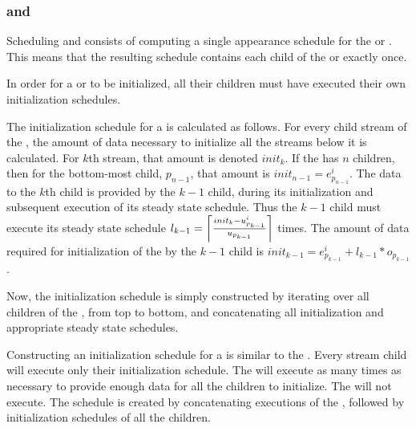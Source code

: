 \subsubsection{{\pipelines} and {\splitjoins}}

Scheduling {\pipelines} and {\splitjoin} consists of computing a
single appearance schedule for the {\pipeline} or {\splitjoin}.
This means that the resulting schedule contains each child of the
{\pipeline} or {\splitjoin} exactly once.

 In order for a
{\pipeline} or {\splitjoin} to be initialized, all their children
must have executed their own initialization schedules.

The initialization schedule for a {\pipeline} is calculated as
follows. For every child stream of the {\pipeline}, the amount of
data necessary to initialize all the streams below it is
calculated. For $k$th stream, that amount is denoted $init_k$. If
the {\pipeline} has $n$ children, then for the bottom-most child,
$p_{n-1}$, that amount is $init_{n-1} = e^i_{p_{n-1}}$. The data
to the $k$th child is provided by the $k-1$ child, during its
initialization and subsequent execution of its steady state
schedule. Thus the $k-1$ child must execute its steady state
schedule $l_{k-1} = \left\lceil init_k - u^i_{p_{k-1}} \over
u_{p_{k-1}} \right\rceil$ times.  The amount of data required for
initialization of the {\pipeline} by the $k-1$ child is
$init_{k-1} = e^i_{p_{k-1}} + l_{k-1} * o_{p_{k-1}}$.

Now, the initialization schedule is simply constructed by
iterating over all children of the {\pipeline}, from top to
bottom, and concatenating all initialization and appropriate
steady state schedules.

Constructing an initialization schedule for a {\splitjoin} is
similar to the {\pipeline}. Every stream child will execute only
their initialization schedule. The {\splitter} will execute as
many times as necessary to provide enough data for all the
children to initialize. The {\joiner} will not execute. The
schedule is created by concatenating executions of the
{\splitter}, followed by initialization schedules of all the
children.

